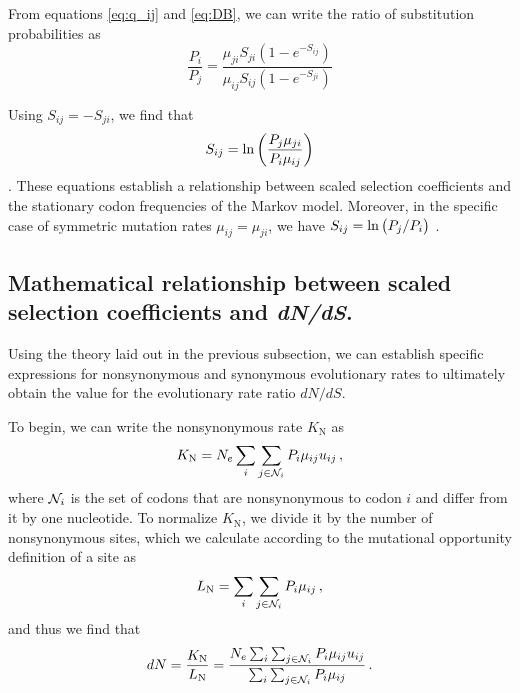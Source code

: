 \documentclass[11pt]{article}
\begin{document}
From equations \eqref{eq:q_ij} and \eqref{eq:DB}, we can write the ratio of substitution probabilities as 
\begin{equation}\label{ratio_q_ij}
\frac{P_i}{P_j} = \frac{\mu_{ji} S_{ji} (1-e^{-S_{ij}})} {\mu_{ij} S_{ij} (1-e^{-S_{ji}})}
\end{equation}


Using $S_{ij} = -S_{ji}$, we find that
\begin{equation}\label{eq:s_pmu}
S_{ij} = \ln\bigg{(} \frac{P_j\mu_{ji}}{P_i\mu_{ij}} \bigg{)} 
\end{equation}
\cite{HalpernBruno1998}. These equations establish a relationship between scaled selection coefficients and the stationary codon frequencies of the Markov model. Moreover, in the specific case of symmetric mutation rates $\mu_{ij} = \mu_{ji}$, we have $S_{ij} = \ln\big{(}P_j/P_i\big{)}$ \cite{SellaHirsh2005}. 


		
\subsection*{Mathematical relationship between scaled selection coefficients and \emph{dN/dS}.} 

Using the theory laid out in the previous subsection, we can establish specific expressions for nonsynonymous and synonymous evolutionary rates to ultimately obtain the value for the evolutionary rate ratio $dN/dS$.

To begin, we can write the nonsynonymous rate $K_\text{N}$ as 
\begin{equation}\label{eq:KN}
	K_\text{N} = N_e \sum_i \sum_{j \in {\cal N}_i} P_i \mu_{ij} u_{ij} \,,
\end{equation}
where ${\cal N}_i$ is the set of codons that are nonsynonymous to codon $i$ and differ from it by one nucleotide. To normalize $K_\text{N}$, we divide it by the number of nonsynonymous sites, which we calculate according to the mutational opportunity definition of a site \cite{GoldmanYang1994, Yang2006} as 
\begin{equation}\label{eq:LN}
	L_\text{N} = \sum_i \sum_{j \in {\cal N}_i} P_i \mu_{ij}\,, 
\end{equation} and thus we find that 
\begin{equation}\label{eq:dN}
	dN = \frac{K_\text{N}}{L_\text{N}}=\frac{N_e \sum_i \sum_{j \in {\cal N}_i} P_i \mu_{ij} u_{ij} } {\sum_i \sum_{j \in {\cal N}_i}P_i \mu_{ij}}\,.
\end{equation}
		
\end{document}
